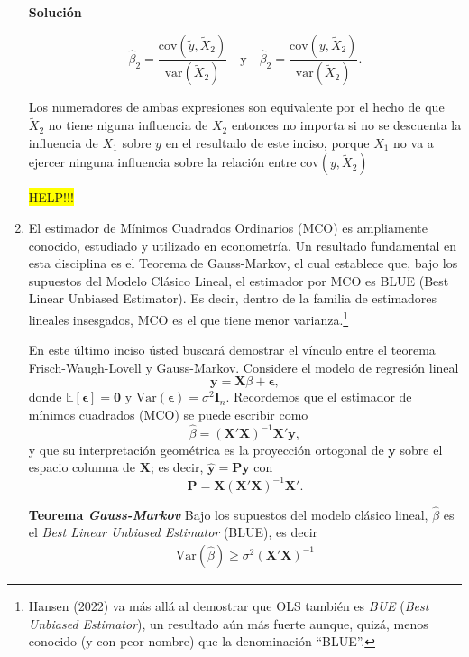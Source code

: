 \documentclass[a4paper, answers, addpoints, 11pt]{exam}
\newenvironment{solucion}{%
  \begin{mdframed}[
    backgroundcolor=blue!5,    %
    linecolor=blue!50,          %
    linewidth=2pt,              %
    leftmargin=10pt,            %
    rightmargin=10pt,           %
    topline=true,              %
    bottomline=true,            %
    roundcorner=10pt,           %
    innerleftmargin=10pt,       %
    innerrightmargin=10pt,      %
    innerbottommargin=10pt,     %
    innertopmargin=10pt         %
  ]%
  \begin{tcolorbox}[colframe=blue!50!black, colback=blue!50, coltitle=white, sharp corners=all, boxrule=1mm, width=\textwidth, halign=left, valign=center, top=0mm, bottom=0mm, left=0mm, right=0mm] \textbf{Solución} \end{tcolorbox} }{\end{mdframed}}
\begin{document}
\begin{enumerate}
\begin{solucion}
\[
\hat{\beta}_2 = \frac{\text{cov}(\tilde{y}, \tilde{X}_2)}{\text{var}(\tilde{X}_2)} \quad \text{y} \quad \hat{\beta}_2 = \frac{\text{cov}(y, \tilde{X}_2)}{\text{var}(\tilde{X}_2)}.
\]

Los numeradores de ambas expresiones son equivalente por el hecho de que \( \tilde{X}_2 \) no tiene niguna influencia de \( X_2 \) entonces no importa si no se descuenta la influencia de \( X_1 \) sobre \( y \) en el resultado de este inciso, porque \( X_1 \) no va a ejercer ninguna influencia sobre la relación entre 
$\text{cov}(y, \tilde{X}_2)$

\colorbox{yellow}{HELP!!!}

\end{solucion}

    \item El estimador de Mínimos Cuadrados Ordinarios (MCO) es ampliamente conocido, estudiado y utilizado en econometría. Un resultado fundamental en esta disciplina es el Teorema de Gauss-Markov, el cual establece que, bajo los supuestos del Modelo Clásico Lineal, el estimador por MCO es BLUE (Best Linear Unbiased Estimator). Es decir, dentro de la familia de estimadores lineales insesgados, MCO es el que tiene menor varianza.\footnote{Hansen (2022) va más allá al demostrar que OLS también es \textit{BUE} (\textit{Best Unbiased Estimator}), un resultado aún más fuerte aunque, quizá, menos conocido (y con peor nombre) que la denominación ``BLUE''.}  
    
    En este último inciso ústed buscará demostrar el vínculo entre el teorema Frisch-Waugh-Lovell y Gauss-Markov. Considere el modelo de regresión lineal
\begin{equation}\label{EQ:modeloGM}
    \mathbf{y} = \mathbf{X}\beta + \boldsymbol\epsilon,
\end{equation}
donde \(\mathbb{E}[\boldsymbol\epsilon] = \mathbf{0}\) y \(\mathrm{Var}(\boldsymbol\epsilon)=\sigma^2 \mathbf{I}_n\). Recordemos que el estimador de mínimos cuadrados (MCO) se puede escribir como
\[
\hat{\beta} = (\mathbf{X}'\mathbf{X})^{-1}\mathbf{X}'\mathbf{y},
\]
y que su interpretación geométrica es la proyección ortogonal de \(\mathbf{y}\) sobre el espacio columna de \(\mathbf{X}\); es decir, \(\hat{\mathbf{y}} = \mathbf{P}\mathbf{y}\) con
\[
\mathbf{P} = \mathbf{X}(\mathbf{X}'\mathbf{X})^{-1}\mathbf{X}'.
\]

\begin{mdframed}
\textbf{Teorema \textit{Gauss-Markov}}
Bajo los supuestos del modelo clásico lineal, \(\hat{\beta}\) es el \emph{Best Linear Unbiased Estimator} (BLUE), es decir
\begin{align}
   \text{Var}(\hat{\beta}) \geq \sigma^2 (\mathbf{X}' \mathbf{X})^{-1}    \tag{Gauss-Markov}
\end{align}
\end{mdframed}


\end{enumerate}
\end{document}
